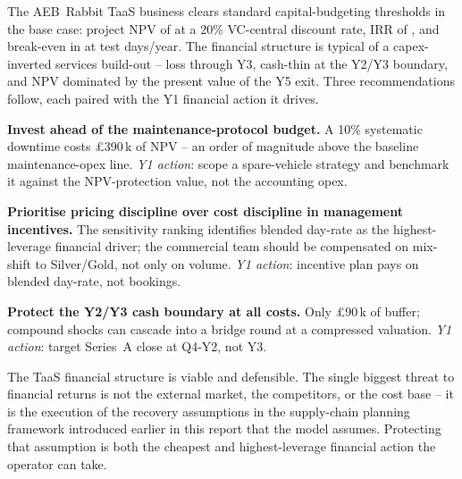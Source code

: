 The AEB~Rabbit TaaS business clears standard capital-budgeting
thresholds in the base case: project NPV of \npvBase at a 20\%
VC-central discount rate, IRR of \irr, and break-even in
\breakEvenYear at \breakEvenDays test days/year. The financial
structure is typical of a capex-inverted services build-out -- loss
through Y3, cash-thin at the Y2/Y3 boundary, and NPV dominated by
the present value of the Y5 exit. Three recommendations follow, each
paired with the Y1 financial action it drives.

\begin{tightenumerate}
  \item \textbf{Invest ahead of the maintenance-protocol budget.}
        A 10\% systematic downtime costs \pounds390\,k of NPV --
        an order of magnitude above the baseline maintenance-opex
        line. \emph{Y1 action}: scope a spare-vehicle strategy
        and benchmark it against the NPV-protection value, not
        the accounting opex.
  \item \textbf{Prioritise pricing discipline over cost discipline
        in management incentives.} The sensitivity ranking
        identifies blended day-rate as the highest-leverage
        financial driver; the commercial team should be
        compensated on mix-shift to Silver/Gold, not only on
        volume. \emph{Y1 action}: incentive plan pays on blended
        day-rate, not bookings.
  \item \textbf{Protect the Y2/Y3 cash boundary at all costs.}
        Only \pounds90\,k of buffer; compound shocks can
        cascade into a bridge round at a compressed valuation.
        \emph{Y1 action}: target Series~A close at Q4-Y2, not Y3.
\end{tightenumerate}

\medskip

\noindent The TaaS financial structure is viable and
defensible. The single biggest threat to financial returns is not
the external market, the competitors, or the cost base -- it is
the execution of the recovery assumptions in the supply-chain planning framework introduced earlier in this report that the model assumes.
Protecting that assumption is both the cheapest and
highest-leverage financial action the operator can take.

\compactbib
